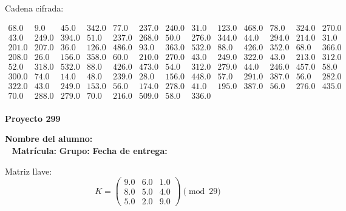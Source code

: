 \documentclass[12pt]{article}
\begin{document}
Cadena cifrada:
\begin{center}
$\begin{array}{lllllllllllll}
68.0 & 9.0 & 45.0 & 342.0 & 77.0 & 237.0 & 240.0 & 31.0 & 123.0 & 468.0 & 78.0 & 324.0 & 270.0\\
43.0 & 249.0 & 394.0 & 51.0 & 237.0 & 268.0 & 50.0 & 276.0 & 344.0 & 44.0 & 294.0 & 214.0 & 31.0\\
201.0 & 207.0 & 36.0 & 126.0 & 486.0 & 93.0 & 363.0 & 532.0 & 88.0 & 426.0 & 352.0 & 68.0 & 366.0\\
208.0 & 26.0 & 156.0 & 358.0 & 60.0 & 210.0 & 270.0 & 43.0 & 249.0 & 322.0 & 43.0 & 213.0 & 312.0\\
52.0 & 318.0 & 532.0 & 88.0 & 426.0 & 473.0 & 54.0 & 312.0 & 279.0 & 44.0 & 246.0 & 457.0 & 58.0\\
300.0 & 74.0 & 14.0 & 48.0 & 239.0 & 28.0 & 156.0 & 448.0 & 57.0 & 291.0 & 387.0 & 56.0 & 282.0\\
322.0 & 43.0 & 249.0 & 153.0 & 56.0 & 174.0 & 278.0 & 41.0 & 195.0 & 387.0 & 56.0 & 276.0 & 435.0\\
70.0 & 288.0 & 279.0 & 70.0 & 216.0 & 509.0 & 58.0 & 336.0\\
\end{array}$
\end{center}

\newpage


\textbf{Proyecto 299}

\textbf{Nombre del alumno:} \underline{\hspace{13cm}}\\\
\vspace{1cm}
\textbf{Matrícula:} \underline{\hspace{4cm}} \hspace{1cm}
\textbf{Grupo:} \underline{\hspace{2cm}}
\textbf{Fecha de entrega:} \underline{\hspace{2cm}}

\medskip

Matriz llave:
\[
K = \begin{pmatrix}
9.0 & 6.0 & 1.0\\
8.0 & 5.0 & 4.0\\
5.0 & 2.0 & 9.0
\end{pmatrix} \pmod{29}
\]
\end{document}
